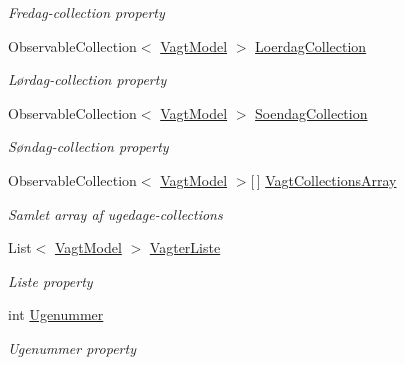\begin{DoxyCompactItemize}
\begin{DoxyCompactList}\small\item\em Fredag-\/collection property \end{DoxyCompactList}\item 
Observable\+Collection$<$ \hyperlink{class__1aarsproeve_1_1_model_1_1_vagt_model}{Vagt\+Model} $>$ \hyperlink{class__1aarsproeve_1_1_model_1_1_vagtplan_singleton_ad7b48a8f9c6bc814aa89af35df3373bd}{Loerdag\+Collection}
\begin{DoxyCompactList}\small\item\em Lørdag-\/collection property \end{DoxyCompactList}\item 
Observable\+Collection$<$ \hyperlink{class__1aarsproeve_1_1_model_1_1_vagt_model}{Vagt\+Model} $>$ \hyperlink{class__1aarsproeve_1_1_model_1_1_vagtplan_singleton_a8e3fc85316b10a3d892718b8705067b1}{Soendag\+Collection}
\begin{DoxyCompactList}\small\item\em Søndag-\/collection property \end{DoxyCompactList}\item 
Observable\+Collection$<$ \hyperlink{class__1aarsproeve_1_1_model_1_1_vagt_model}{Vagt\+Model} $>$\mbox{[}$\,$\mbox{]} \hyperlink{class__1aarsproeve_1_1_model_1_1_vagtplan_singleton_a1517f87a41a08159dbb44fe024207b70}{Vagt\+Collections\+Array}
\begin{DoxyCompactList}\small\item\em Samlet array af ugedage-\/collections \end{DoxyCompactList}\item 
List$<$ \hyperlink{class__1aarsproeve_1_1_model_1_1_vagt_model}{Vagt\+Model} $>$ \hyperlink{class__1aarsproeve_1_1_model_1_1_vagtplan_singleton_a290144ecbd07ab56a48bb4f8555ac6b1}{Vagter\+Liste}
\begin{DoxyCompactList}\small\item\em Liste property \end{DoxyCompactList}\item 
int \hyperlink{class__1aarsproeve_1_1_model_1_1_vagtplan_singleton_a15018dbaee9711170c17635c6665480d}{Ugenummer}
\begin{DoxyCompactList}\small\item\em Ugenummer property \end{DoxyCompactList}\end{DoxyCompactItemize}
